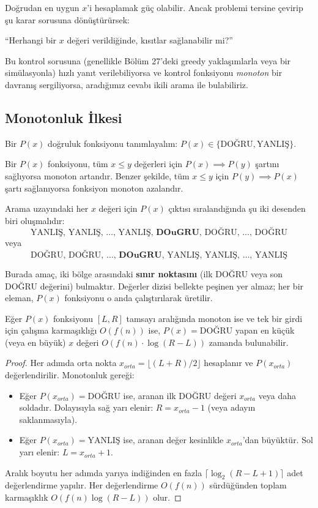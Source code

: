 Doğrudan en uygun $x$'i hesaplamak güç olabilir. Ancak problemi tersine çevirip şu karar sorusuna dönüştürürsek:
\begin{center}
``Herhangi bir $x$ değeri verildiğinde, kısıtlar sağlanabilir mi?''
\end{center}
Bu kontrol sorusuna (genellikle Bölüm 27'deki greedy yaklaşımlarla veya bir simülasyonla) hızlı yanıt verilebiliyorsa ve kontrol fonksiyonu \emph{monoton} bir davranış sergiliyorsa, aradığımız cevabı ikili arama ile bulabiliriz.

\subsection{Monotonluk İlkesi}

Bir $P(x)$ doğruluk fonksiyonu tanımlayalım: $P(x) \in \{\text{DOĞRU}, \text{YANLIŞ}\}$.

\begin{definition}
Bir $P(x)$ fonksiyonu, tüm $x \le y$ değerleri için $P(x) \implies P(y)$ şartını sağlıyorsa monoton artandır.
Benzer şekilde, tüm $x \le y$ için $P(y) \implies P(x)$ şartı sağlanıyorsa fonksiyon monoton azalandır.
\end{definition}

Arama uzayındaki her $x$ değeri için $P(x)$ çıktısı sıralandığında şu iki desenden biri oluşmalıdır:
\[ \text{YANLIŞ}, \, \text{YANLIŞ}, \, \dots, \, \text{YANLIŞ}, \, \mathbf{DOu{G}RU}, \, \text{DOĞRU}, \, \dots, \, \text{DOĞRU} \]
veya
\[ \text{DOĞRU}, \, \text{DOĞRU}, \, \dots, \, \mathbf{DOu{G}RU}, \, \text{YANLIŞ}, \, \text{YANLIŞ}, \, \dots, \, \text{YANLIŞ} \]

Burada amaç, iki bölge arasındaki \textbf{sınır noktasını} (ilk DOĞRU veya son DOĞRU değerini) bulmaktır. Değerler dizisi bellekte peşinen yer almaz; her bir eleman, $P(x)$ fonksiyonu o anda çalıştırılarak üretilir.

\begin{theorem}
Eğer $P(x)$ fonksiyonu $[L, R]$ tamsayı aralığında monoton ise ve tek bir girdi için çalışma karmaşıklığı $O(f(n))$ ise, $P(x) = \text{DOĞRU}$ yapan en küçük (veya en büyük) $x$ değeri $O(f(n) \cdot \log(R - L))$ zamanda bulunabilir.
\end{theorem}

\begin{proof}
Her adımda orta nokta $x_{orta} = \lfloor (L + R) / 2 \rfloor$ hesaplanır ve $P(x_{orta})$ değerlendirilir.
Monotonluk gereği:
\begin{itemize}
    \item Eğer $P(x_{orta}) = \text{DOĞRU}$ ise, aranan ilk DOĞRU değeri $x_{orta}$ veya daha soldadır. Dolayısıyla sağ yarı elenir: $R = x_{orta} - 1$ (veya adayın saklanmasıyla).
    \item Eğer $P(x_{orta}) = \text{YANLIŞ}$ ise, aranan değer kesinlikle $x_{orta}$'dan büyüktür. Sol yarı elenir: $L = x_{orta} + 1$.
\end{itemize}
Aralık boyutu her adımda yarıya indiğinden en fazla $\lceil \log_2(R - L + 1) \rceil$ adet değerlendirme yapılır. Her değerlendirme $O(f(n))$ sürdüğünden toplam karmaşıklık $O(f(n) \log(R - L))$ olur.
\end{proof}

